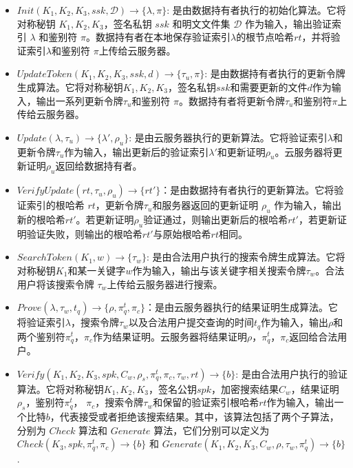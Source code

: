 \begin{definition}
{\begin{itemize}
        \item $Init(K_1,K_2,K_3, ssk, \mathcal{D}) \rightarrow \{\lambda,\pi\}$: 是由数据持有者执行的初始化算法。它将对称秘钥 $K_1,K_2,K_3$，签名私钥 $ssk$ 和明文文件集 $\mathcal{D}$ 作为输入，输出验证索引 $\lambda$ 和鉴别符 $\pi$。数据持有者在本地保存验证索引$\lambda$的根节点哈希$rt$，并将验证索引$\lambda$和鉴别符 $\pi$上传给云服务器。
        \item $UpdateToken(K_1,K_2,K_3, ssk, d) \rightarrow \{\tau_u, \pi\}$: 是由数据持有者执行的更新令牌生成算法。它将对称秘钥$K_1,K_2,K_3$，签名私钥$ssk$和需要更新的文件$d$作为输入，输出一系列更新令牌$\tau_u$和鉴别符 $\pi$。数据持有者将更新令牌$\tau_u$和鉴别符$\pi$上传给云服务器。
        \item $Update(\lambda, \tau_u) \rightarrow \{\lambda',\rho_u\}$: 是由云服务器执行的更新算法。它将验证索引$\lambda$和更新令牌$\tau_u$作为输入，输出更新后的验证索引$\lambda'$和更新证明$\rho_u$。云服务器将更新证明$\rho_u$返回给数据持有者。
        \item $VerifyUpdate(rt,\tau_u,\rho_u) \rightarrow \{rt'\}$：是由数据持有者执行的更新算法。它将验证索引的根哈希 $rt$，更新令牌$\tau_u$和服务器返回的更新证明 $\rho_u$ 作为输入，输出新的根哈希$rt'$。若更新证明$\rho_u$验证通过，则输出更新后的根哈希$rt'$，若更新证明验证失败，则输出的根哈希$rt'$与原始根哈希$rt$相同。
        \item $SearchToken(K_1, w) \rightarrow \{\tau_{w}\}$: 是由合法用户执行的搜索令牌生成算法。它将对称秘钥$K_1$和某一关键字$w$作为输入，输出与该关键字相关搜索令牌$\tau_{w}$。合法用户将该搜索令牌 $\tau_{w}$上传给云服务器进行搜索。
        \item $Prove(\lambda, \tau_{w}, t_q) \rightarrow \{\rho,\pi^t_q, \pi_c\}$：是由云服务器执行的结果证明生成算法。它将验证索引$\lambda$，搜索令牌$\tau_{w}$以及合法用户提交查询的时间$t_q$作为输入，输出$\rho$和两个鉴别符$\pi^t_q$，$\pi_c$作为结果证明。云服务器将结果证明$\rho$，$\pi^t_q$，$\pi_c$返回给合法用户。
        \item $Verify(K_1,K_2,K_3, spk, C_w, \rho_s, \pi^t_q, \pi_c, \tau_{w},rt) \rightarrow \{b\}$: 是由合法用户执行的验证算法。它将对称秘钥$K_1,K_2,K_3$，签名公钥$spk$，加密搜索结果$C_w$，结果证明$\rho_s$，鉴别符$\pi^t_q$， $\pi_c$，搜索令牌$\tau_{w}$和保留的验证索引根哈希$rt$作为输入，输出一个比特$b$，代表接受或者拒绝该搜索结果。其中，该算法包括了两个子算法，分别为 $Check$ 算法和 $Generate$ 算法，它们分别可以定义为 $Check(K_3, spk, \pi^t_q, \pi_c) \rightarrow \{b\}$ 和 $Generate(K_1,K_2,K_3,C_w,\rho,\tau_{w},\pi^t_q) \rightarrow \{b\}$.
      \end{itemize}
      }
\end{definition}

